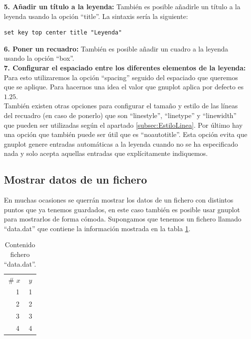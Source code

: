 \documentclass[11pt,a4paper,twoside,pdf]{article}
\numberwithin{equation}{section}
\begin{document}
\textbf{5. Añadir un título a la leyenda:} También es posible añadirle un título a la leyenda usando la opción ``title''. La sintaxis sería la siguiente:

\begin{lstlisting}[language=Gnuplot]
set key top center title "Leyenda"
\end{lstlisting}

\textbf{6. Poner un recuadro:} También es posible añadir un cuadro a la leyenda usando la opción ``box''.\\

\textbf{7. Configurar el espaciado entre los diferentes elementos de la leyenda:} Para esto utilizaremos la opción ``spacing'' seguido del espaciado que queremos que se aplique. Para hacernos una idea el valor que gnuplot aplica por defecto es $1.25$.\\

También existen otras opciones para configurar el tamaño y estilo de las líneas del recuadro (en caso de ponerlo) que son ``linestyle'', ``linetype'' y ``linewidth'' que pueden ser utilizadas según el apartado \ref{subsec:EstiloLinea}. Por último hay una opción que también puede ser útil que es ``noautotitle''. Esta opción evita que gnuplot genere entradas automáticas a la leyenda cuando no se ha especificado nada y solo acepta aquellas entradas que explícitamente indiquemos.

\subsection{Mostrar datos de un fichero\label{subsec:DatosFichero}}

En muchas ocasiones se querrán mostrar los datos de un fichero con distintos puntos que ya tenemos guardados, en este caso también es posible usar gnuplot para mostrarlos de forma cómoda. Supongamos que tenemos un fichero llamado ``data.dat'' que contiene la información mostrada en la tabla \ref{tab:data_plot_fichero}.

\begin{table}[h]
    \centering
    \caption{Contenido fichero ``data.dat''.}
    \vspace{10pt}
    \label{tab:data_plot_fichero}
    \begin{tabular}{cc}
        \# $x$ & $y$ \\
        \ \ 1 & 1 \\
        \ \ 2 & 2 \\
        \ \ 3 & 3 \\
        \ \ 4 & 4 \\
    \end{tabular}
\end{table}
\end{document}
